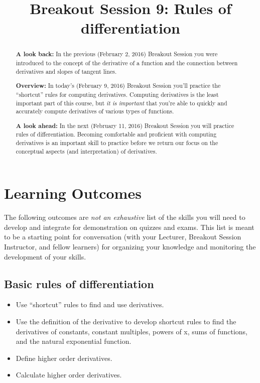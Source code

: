\documentclass[handout,nooutcomes]{ximera}
\title{Breakout Session 9: Rules of differentiation}
\begin{document}
\begin{abstract}
  \textbf{A look back:} In the previous (February 2, 2016) Breakout Session you were introduced to the concept of the derivative of a function and the connection between derivatives and slopes of tangent lines.

  \textbf{Overview:} In today's (February 9, 2016) Breakout Session you'll practice the ``shortcut'' rules for computing derivatives.
  Computing derivatives is the least important part of this course, but \emph{it is important} that you're able to quickly and accurately compute derivatives of various types of functions.

  \textbf{A look ahead:} In the next (February 11, 2016) Breakout Session you will practice rules of differentiation.
  Becoming comfortable and proficient with computing derivatives is an important skill to practice before we return our focus on the conceptual aspects (and interpretation) of derivatives. 
\end{abstract}
\maketitle

\section{Learning Outcomes}
\label{section:learning-outcomes}
The following outcomes are \emph{not an exhaustive} list of the skills you will need to develop and integrate for demonstration on quizzes and exams.
This list is meant to be a starting point for conversation (with your Lecturer, Breakout Session Instructor, and fellow learners) for organizing your knowledge and monitoring the development of your skills.

\subsection*{Basic rules of differentiation}
\begin{itemize}
  \item
    Use ``shortcut'' rules to find and use derivatives.

  \item 
    Use the definition of the derivative to develop shortcut rules to find the derivatives of constants, constant multiples, powers of x, sums of functions, and the natural exponential function.

  \item
    Define higher order derivatives.

  \item
    Calculate higher order derivatives.
\end{itemize}
\end{document}
